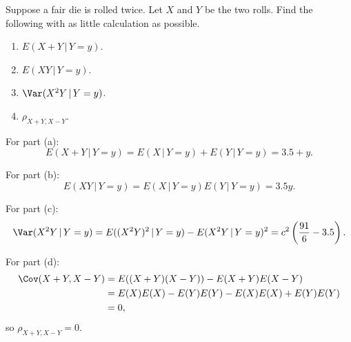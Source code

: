 \begin{problem}[Handout 15, \# 15]
  Suppose a fair die is rolled twice. Let \(X\) and \(Y\) be the two
  rolls. Find the following with as little calculation as possible.
  \begin{enumerate}[label=(\alph*),noitemsep]
  \item \(E(X+Y\,|\,Y=y)\).
  \item \(E(XY\,|\,Y=y)\).
  \item \(\Var(X^2Y\,|\,Y=y)\).
  \item \(\rho_{X+Y,X-Y}\).
  \end{enumerate}
\end{problem}
\begin{solution}
  For part (a):
  \[E(X+Y\,|\,Y=y) = E(X\,|\,Y=y) + E(Y\,|\,Y=y) = 3.5+y.\]

  For part (b):
  \[E(XY\,|\,Y=y) = E(X\,|\,Y=y)E(Y\,|\,Y=y) = 3.5y.\]

  For part (c):
  \[
    \Var(X^2Y\,|\,Y=y)=E((X^2Y)^2\,|\,Y=y)-E(X^2Y\,|\,Y=y)^2
    =c^2\left(\frac{91}{6}-3.5\right).
  \]

  For part (d):
  \begin{align*}
    \Cov(X+Y,X-Y)
    &=E((X+Y)(X-Y))-E(X+Y)E(X-Y)\\
    &=E(X)E(X)-E(Y)E(Y)-E(X)E(X)+E(Y)E(Y)\\
    &=0,
  \end{align*}
  so $\rho_{X+Y,X-Y} = 0$.
\end{solution}
\newpage

